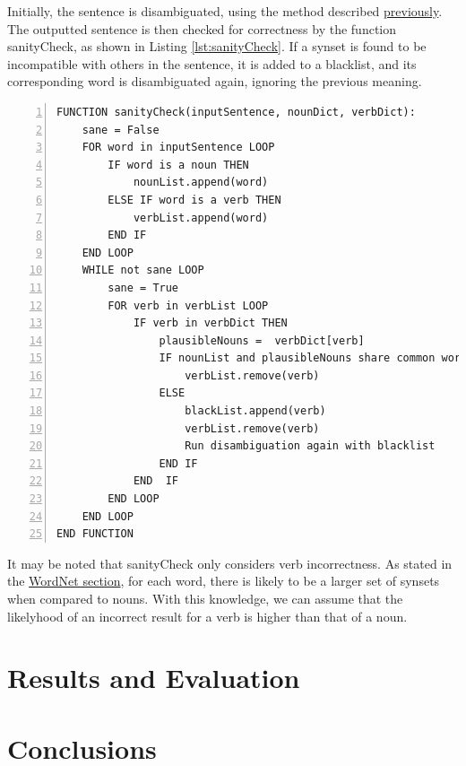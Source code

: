 \documentclass[]{article}
\begin{document}
Initially, the sentence is disambiguated, using the method described \hyperref[sec:ImplementedDisambiguation]{previously}. The outputted sentence is then checked for correctness by the function sanityCheck, as shown in Listing \ref{lst:sanityCheck}. If a synset is found to be incompatible with others in the sentence, it is added to a blacklist, and its corresponding word is disambiguated again, ignoring the previous meaning.

\begin{lstlisting}[numbers=left, numberstyle=\small, caption={The sanityCheck function}, captionpos=b, label={lst:sanityCheck}]
FUNCTION sanityCheck(inputSentence, nounDict, verbDict):
    sane = False
    FOR word in inputSentence LOOP
        IF word is a noun THEN
            nounList.append(word)
        ELSE IF word is a verb THEN
            verbList.append(word)
        END IF
    END LOOP
    WHILE not sane LOOP
        sane = True
        FOR verb in verbList LOOP
            IF verb in verbDict THEN
                plausibleNouns =  verbDict[verb]
                IF nounList and plausibleNouns share common words THEN
                    verbList.remove(verb)
                ELSE
                    blackList.append(verb)
                    verbList.remove(verb)
                    Run disambiguation again with blacklist
                END IF
            END  IF
		END LOOP
	END LOOP
END FUNCTION
\end{lstlisting}

It may be noted that sanityCheck only considers verb incorrectness. As stated in the \hyperref[Verbs]{WordNet section}, for each word, there is likely to be a larger set of synsets when compared to nouns. With this knowledge, we can assume that the likelyhood of an incorrect result for a verb is higher than that of a noun. 



\section{Results and Evaluation}
\label{sec:Results}

\section{Conclusions}
\label{sec:Conclusions}

\newpage


\end{document}
